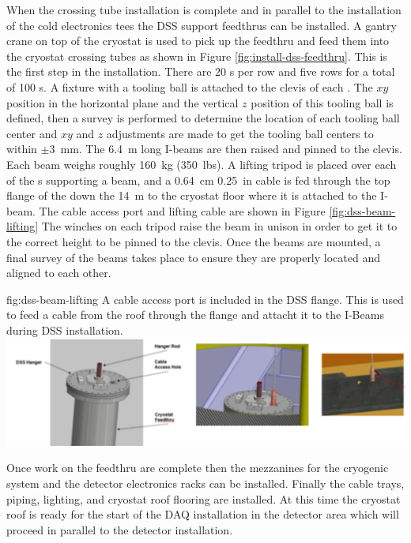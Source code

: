 When the crossing tube installation is complete and in parallel to the installation of the cold electronics tees the DSS support feedthrus can be installed. A gantry crane on top of the cryostat is used to pick up the feedthru and feed them into the cryostat crossing tubes as shown in Figure \ref{fig:install-dss-feedthru}.
This is the first step in the  installation.
There are \num{20} \fdth{}s per row and five rows for a total of \num{100} \fdth{}s.  
A fixture with a tooling ball is attached to the
clevis of each \fdth.  
The $xy$ position in the horizontal plane
and the vertical $z$ position of this tooling ball is defined, then a  survey is performed to determine the location of each tooling ball center and $xy$ and $z$ adjustments are made to get the tooling
ball centers to within $\pm$\SI{3}{mm}.  
The \SI{6.4}{m} long I-beams are then raised and pinned to the clevis.  Each beam weighs roughly \SI{160}{kg} (\SI{350}{lbs}).
A lifting tripod is placed over each of the \fdth{}s supporting a beam, and a \SI{0.64}{cm} \SI{0.25}{in}  %
cable is fed through the top
flange of the \fdth down the \SI{14}{m} to the cryostat floor where it
is attached to the I-beam. The cable access port and lifting cable are shown in Figure \ref{fig:dss-beam-lifting} 
The winches on each tripod raise the beam in unison in order to get it to the correct height to be pinned to the \fdth clevis.  
Once the beams are mounted, a final survey of the beams takes place to ensure they are properly located and aligned to each other.

 \begin{dunefigure}{fig:dss-beam-lifting}
  {A cable access port is included in the DSS flange. This is used to feed a cable from the roof through the flange and attacht it to the I-Beams during DSS installation.}
 \includegraphics[width=.95\textwidth]{graphics/dss-beam-lifting.pdf}
\end{dunefigure}

Once work on the feedthru are complete then the mezzanines for the cryogenic system and the detector electronics racks can be installed. Finally the cable trays,  piping, lighting, and cryostat roof flooring are installed. 
At this time the cryostat roof is ready for the start of the DAQ installation in the detector area which will proceed in parallel to the detector installation.

